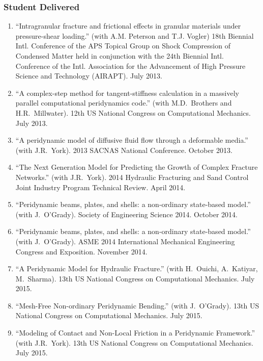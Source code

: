 \subsubsection*{Student Delivered}

\ifdefined\iscockrell
\begin{enumerate}
  \item ``Intragranular fracture and frictional effects in granular materials under pressure-shear loading.'' (with A.M. Peterson and T.J. Vogler) 18th Biennial Intl. Conference of the APS Topical Group on Shock Compression of Condensed Matter held in conjunction with the 24th Biennial Intl. Conference of the Intl. Association for the Advancement of High Pressure Science and Technology (AIRAPT). July 2013.
  \item ``A complex-step method for tangent-stiffness calculation in a massively parallel computational peridynamics code.'' (with M.D.~Brothers and H.R.~Millwater). 12th US National Congress on Computational Mechanics. July 2013.
  \item ``A peridynamic model of diffusive fluid flow through a deformable media.'' (with J.R.~York). 2013 SACNAS National Conference. October 2013.
  \item ``The Next Generation Model for Predicting the Growth of Complex Fracture Networks.'' (with J.R.~York). 2014 Hydraulic Fracturing and Sand Control Joint Industry Program Technical Review.  April 2014.
  \item ``Peridynamic beams, plates, and shells: a non-ordinary state-based model.'' (with J.~O'Grady). Society of Engineering Science 2014. October 2014.
  \item ``Peridynamic beams, plates, and shells: a non-ordinary state-based model.'' (with J.~O'Grady). ASME 2014 International Mechanical Engineering Congress and Exposition. November 2014.
  \item ``A Peridynamic Model for Hydraulic Fracture.'' (with H.~Ouichi, A.~Katiyar, M.~Sharma). 13th US National Congress on Computational Mechanics. July 2015.
  \item ``Mesh-Free Non-ordinary Peridynamic Bending.'' (with J.~O'Grady). 13th US National Congress on Computational Mechanics. July 2015.
  \item ``Modeling of Contact and Non-Local Friction in a Peridynamic Framework.'' (with J.R.~York). 13th US National Congress on Computational Mechanics. July 2015.
\end{enumerate}
\else
\ifdefined\ispdf
